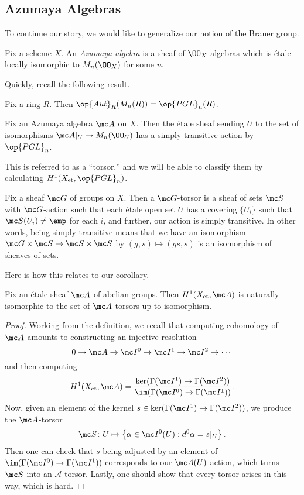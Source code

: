 \documentclass[../notes.tex]{subfiles}
\begin{document}
\subsection{Azumaya Algebras}
To continue our story, we would like to generalize our notion of the Brauer group.
\begin{definition}
	Fix a scheme $X$. An \textit{Azumaya algebra} is a sheaf of $\OO_X$-algebras which is \'etale locally isomorphic to $M_n(\OO_X)$ for some $n$.
\end{definition}
Quickly, recall the following result.
\begin{theorem}
	Fix a ring $R$. Then $\op{Aut}_R(M_n(R))=\op{PGL}_n(R)$.
\end{theorem}
\begin{corollary}
	Fix an Azumaya algebra $\mc A$ on $X$. Then the \'etale sheaf sending $U$ to the set of isomorphisms $\mc A|_U\to M_n(\OO_U)$ has a simply transitive action by $\op{PGL}_n$.
\end{corollary}
This is referred to as a ``torsor,'' and we will be able to classify them by calculating $H^1(X_{\mathrm{et}},\op{PGL}_n)$.
\begin{definition}[torsor]
	Fix a sheaf $\mc G$ of groups on $X$. Then a $\mc G$-torsor is a sheaf of sets $\mc S$ with $\mc G$-action such that each \'etale open set $U$ has a covering $\{U_i\}$ such that $\mc S(U_i)\ne\emp$ for each $i$, and further, our action is simply transitive. In other words, being simply transitive means that we have an isomorphism $\mc G\times\mc S\to\mc S\times\mc S$ by $(g,s)\mapsto(gs,s)$ is an isomorphism of sheaves of sets.
\end{definition}
Here is how this relates to our corollary.
\begin{proposition}
	Fix an \'etale sheaf $\mc A$ of abelian groups. Then $H^1(X_{\mathrm{et}},\mc A)$ is naturally isomorphic to the set of $\mc A$-torsors up to isomorphism.
\end{proposition}
\begin{proof}
	Working from the definition, we recall that computing cohomology of $\mc A$ amounts to constructing an injective resolution
	\[0\to\mc A\to\mc I^0\to\mc I^1\to\mc I^2\to\cdots\]
	and then computing
	\[H^1(X_{\mathrm{et}},\mc A)=\frac{\ker(\Gamma(\mc I^1)\to\Gamma(\mc I^2))}{\im(\Gamma(\mc I^0)\to\Gamma(\mc I^1))}.\]
	Now, given an element of the kernel $s\in\ker(\Gamma(\mc I^1)\to\Gamma(\mc I^2))$, we produce the $\mc A$-torsor
	\[\mc S\colon U\mapsto\left\{\alpha\in\mc I^0(U):d^0\alpha=s|_U\right\}.\]
	Then one can check that $s$ being adjusted by an element of $\im(\Gamma(\mc I^0)\to\Gamma(\mc I^1))$ corresponds to our $\mc A(U)$-action, which turns $\mc S$ into an $\mathcal A$-torsor. Lastly, one should show that every torsor arises in this way, which is hard.
\end{proof}
\end{document}
